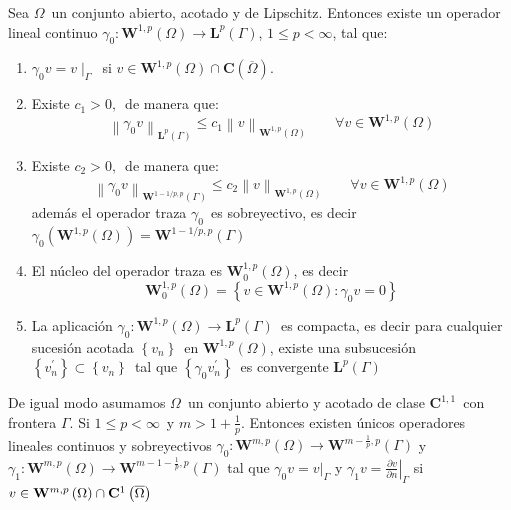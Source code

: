 \begin{teo}	
	\label{Teorema de Trazas}Sea $\Omega $\ un conjunto abierto, acotado y de
	Lipschitz. Entonces existe un operador lineal continuo $\gamma _{0}:\mathbf{W%
	}^{1,p}\left( \Omega \right) \rightarrow \mathbf{L}^{p}\left( \Gamma \right)
	$, $1\leqslant p<\infty $, tal que:
	\begin{enumerate}
		\item  $\gamma _{0}v=v\mid _{\Gamma }$\ si $v\in \mathbf{W}^{1,p}\left(
		\Omega \right) \cap \mathbf{C}\left( \overline{\Omega }\right) .$
		\item  Existe $c_{1}>0,$\ de manera que:
		\[
		\left\| \gamma _{0}v\right\| _{\mathbf{L}^{p}(\Gamma )}\leqslant
		c_{1}\left\| v\right\| _{\mathbf{W}^{1,p}(\Omega )}\qquad \forall v\in
		\mathbf{W}^{1,p}(\Omega )
		\]
		\item  Existe $c_{2}>0,$\ de manera que:
		\[
		\left\| \gamma _{0}v\right\| _{\mathbf{W}^{1-1/p,p}(\Gamma )}\leqslant
		c_{2}\left\| v\right\| _{\mathbf{W}^{1,p}(\Omega )}\qquad \forall v\in
		\mathbf{W}^{1,p}(\Omega )
		\]
		además el operador traza $\gamma _{0}$\ es sobreyectivo, es decir $%
		\gamma _{0}\left( \mathbf{W}^{1,p}(\Omega )\right) =\mathbf{W}%
		^{1-1/p,p}(\Gamma )$
		\item  El núcleo del operador traza es $\mathbf{W}_{0}^{1,p}(\Omega )$,
		es decir
		\[
		\mathbf{W}_{0}^{1,p}(\Omega )=\left\{ v\in \mathbf{W}^{1,p}(\Omega ):\gamma
		_{0}v=0\right\}
		\]
		\item  La aplicación $\gamma _{0}:\mathbf{W}^{1,p}\left( \Omega \right)
		\rightarrow \mathbf{L}^{p}\left( \Gamma \right) $\ es compacta, es decir
		para cualquier sucesión acotada $\left\{ v_{n}\right\} $\ en $\mathbf{W}%
		^{1,p}\left( \Omega \right) $, existe una subsucesión $\left\{
		v_{n}^{\prime }\right\} \subset \left\{ v_{n}\right\} $\ tal que $\left\{
		\gamma _{0}v_{n}^{\prime }\right\} $\ es convergente $\mathbf{L}^{p}\left(
		\Gamma \right) $
	\end{enumerate}
	De igual modo asumamos $\Omega $\ un conjunto abierto y acotado de clase $%
	\mathbf{C}^{1,1}$\ con frontera $\Gamma $. Si $1\leqslant p<\infty $\ y $m>1+%
	\frac{1}{p}$. Entonces existen únicos operadores lineales continuos y
	sobreyectivos $\gamma _{0}:\mathbf{W}^{m,p}\left( \Omega \right) \rightarrow
	\mathbf{W}^{m-\frac{1}{p},p}\left( \Gamma \right)$ y $\gamma _{1}:\mathbf{W}%
	^{m,p}\left( \Omega \right) \rightarrow \mathbf{W}^{m-1-\frac{1}{p},p}\left(
	\Gamma \right) $ tal que $\gamma _{0}v=\left.v\right\vert_{\Gamma }$ y $\gamma
	_{1}v=\left. \frac{\partial v}{\partial n}\right\vert_{\Gamma }$ si $v\in
	\mathbf{W}^{m,p}\left( \Omega \right) \cap \mathbf{C}^{1}\left( \overline{%
		\Omega }\right) $
\end{teo}

